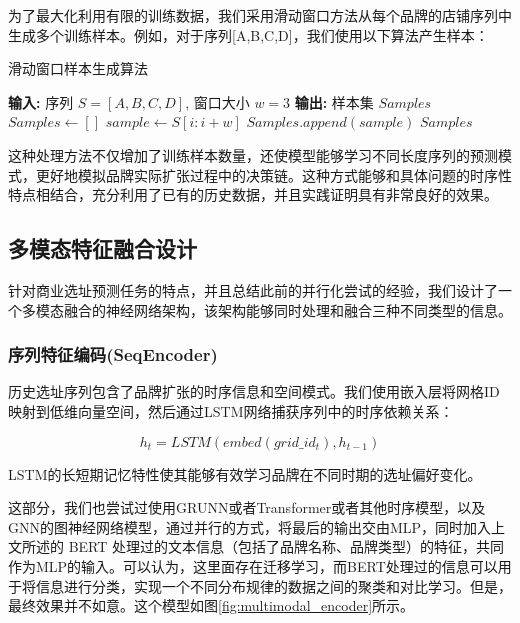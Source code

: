 \documentclass{article}
\begin{document}
为了最大化利用有限的训练数据，我们采用滑动窗口方法从每个品牌的店铺序列中生成多个训练样本。例如，对于序列[A,B,C,D]，我们使用以下算法产生样本：

\begin{algorithm}
\caption{滑动窗口样本生成算法}
\begin{algorithmic}[1]
\State \textbf{输入:} 序列 $S = [A, B, C, D]$, 窗口大小 $w = 3$
\State \textbf{输出:} 样本集 $Samples$
\State $Samples \gets []$
    \State $sample \gets S[i:i+w]$
    \State $Samples.append(sample)$
\EndFor
\State \Return $Samples$
\end{algorithmic}
\end{algorithm}

这种处理方法不仅增加了训练样本数量，还使模型能够学习不同长度序列的预测模式，更好地模拟品牌实际扩张过程中的决策链。这种方式能够和具体问题的时序性特点相结合，充分利用了已有的历史数据，并且实践证明具有非常良好的效果。

\subsection{多模态特征融合设计}

针对商业选址预测任务的特点，并且总结此前的并行化尝试的经验，我们设计了一个多模态融合的神经网络架构，该架构能够同时处理和融合三种不同类型的信息。

\subsubsection{序列特征编码(SeqEncoder)}

历史选址序列包含了品牌扩张的时序信息和空间模式。我们使用嵌入层将网格ID映射到低维向量空间，然后通过LSTM网络捕获序列中的时序依赖关系：

\begin{equation}
h_t = LSTM(embed(grid\_id_t), h_{t-1})
\end{equation}

LSTM的长短期记忆特性使其能够有效学习品牌在不同时期的选址偏好变化。

这部分，我们也尝试过使用GRUNN或者Transformer或者其他时序模型，以及GNN的图神经网络模型，通过并行的方式，将最后的输出交由MLP，同时加入上文所述的 BERT 处理过的文本信息（包括了品牌名称、品牌类型）的特征，共同作为MLP的输入。可以认为，这里面存在迁移学习，而BERT处理过的信息可以用于将信息进行分类，实现一个不同分布规律的数据之间的聚类和对比学习。但是，最终效果并不如意。这个模型如图\ref{fig:multimodal_encoder}所示。
\end{document}
